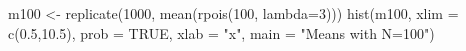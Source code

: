 \begin{Schunk}
\begin{Sinput}
  m100 <- replicate(1000, mean(rpois(100, lambda=3)))
  hist(m100, xlim = c(0.5,10.5), prob = TRUE, xlab = "x", main = "Means with N=100")
\end{Sinput}
\end{Schunk}
